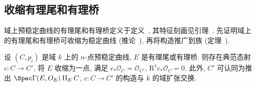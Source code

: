 \subsection{收缩有理尾和有理桥}\label{src:6.6.1-subsection}
域上预稳定曲线的有理尾和有理桥定义于定义~, 其特征刻画见引理~. 先证明域上的有理尾和有理桥可收缩为稳定曲线 (推论~), 再将构造推广到族 (定理~).
\begin{proposition}[收缩有理尾或有理桥]\label{src:6.6.1}
设 $(C,\allowbreak p_i)$ 是域 $k$ 上的 $n$-点预稳定曲线, $E$ 是有理尾或有理桥. 则存在典范态射 $c:C\to\allowbreak C'$, 将 $E$ 收缩为一点, 满足 $c_*\mathcal O_C=\mathcal O_{C'}$, $\mathrm R^1c_*\mathcal O_C=0$. 此外, $C'$ 可认同为推出 $\Spec\Gamma(E,\allowbreak \mathcal O_E)\amalg_E C$, $c:C\to\allowbreak C'$ 的构造与 $k$ 的域扩张交换.
\end{proposition}
